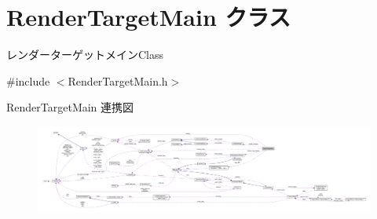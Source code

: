 \hypertarget{class_render_target_main}{}\section{Render\+Target\+Main クラス}
\label{class_render_target_main}


レンダーターゲットメイン\+Class  




{\ttfamily \#include $<$Render\+Target\+Main.\+h$>$}



Render\+Target\+Main 連携図\nopagebreak
\begin{figure}[H]
\begin{center}
\leavevmode
\includegraphics[width=350pt]{class_render_target_main__coll__graph}
\end{center}
\end{figure}
